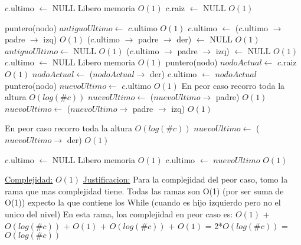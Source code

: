 \begin{Algoritmos}
\begin{algorithm}[H]
\begin{algorithmic}[1]
        \State $c$.ultimo $\gets$ NULL \Comment Libero memoria $O(1)$
        \State $c$.raiz $\gets$ NULL \Comment $O(1)$
    \Else

        \State puntero(nodo) $antiguoUltimo \gets$ $c$.ultimo \Comment $O(1)$
        \State $c$.ultimo $\gets$ ($c$.ultimo $\to$ padre $\to$ izq) \Comment $O(1)$
        \State ($c$.ultimo $\to$ padre $\to$ der) $\gets$ NULL \Comment $O(1)$
        \State $antiguoUltimo \gets$ NULL \Comment $O(1)$
    \Else
            \State ($c$.ultimo $\to$ padre $\to$ izq) $\gets$ NULL \Comment $O(1)$
            \State $c$.ultimo $\gets$ NULL \Comment Libero memoria $O(1)$
            \State puntero(nodo) $nodoActual \gets$ $c$.raiz \Comment $O(1)$
                $nodoActual \gets$ ($nodoActual \to$ der)
            \EndWhile
            \State $c$.ultimo $\gets$ $nodoActual$
        \Else
            \State puntero(nodo) $nuevoUltimo \gets$ $c$.ultimo \Comment $O(1)$
              \Comment En peor caso recorro toda la altura $O(log(\#c))$
                \State $nuevoUltimo \gets$ ($nuevoUltimo \to$ padre) \Comment $O(1)$  
            \EndWhile
            \State $nuevoUltimo \gets$ ($nuevoUltimo \to$ padre $\to$ izq)  \Comment $O(1)$

              \Comment En peor caso recorro toda la altura  $O(log(\#c))$
                \State $nuevoUltimo \gets$ ($nuevoUltimo \to$ der) \Comment $O(1)$  
            \EndWhile

            \State $c$.ultimo $\gets$ NULL \Comment Libero memoria $O(1)$
            \State $c$.ultimo $\gets$ $nuevoUltimo$ \Comment $O(1)$

        \EndIf


    \EndIf

    \EndIf

    \medskip
    \Statex \underline{Complejidad:} $O(1)$
    \Statex \underline{Justificacion:} Para la complejidad del peor caso, tomo la rama que mas complejidad tiene. Todas las ramas son O(1) (por ser suma de O(1)) expecto la que contiene los While (cuando es hijo izquierdo pero no el unico del nivel) En esta rama, loa complejidad en peor caso es: $O(1)$ + $O(log(\#c))$ + $O(1)$ + $O(log(\#c))$ + $O(1)$ = 2*$O(log(\#c))$ = $O(log(\#c))$

\end{algorithmic}
\end{algorithm}


\end{Algoritmos}
